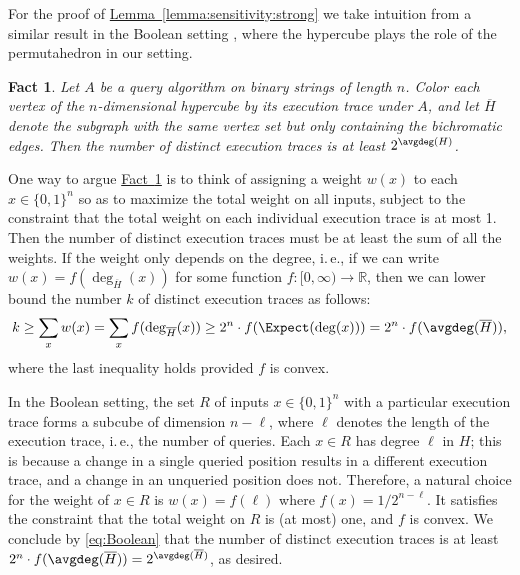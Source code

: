 \documentclass[11pt]{article}
\numberwithin{equation}{section}
\newtheorem{fact}[theorem]{Fact}
\theoremstyle{definition}
\theoremstyle{plain}
\newcommand{\ie}{i.\,e.}
\newcommand{\expref}[2]{\hyperref[#2]{#1~\ref{#2}}}
\begin{document}
For the proof of \expref{Lemma}{lemma:sensitivity:strong} we take intuition from a similar result in the Boolean setting \cite[Exercise~8.43]{ODonnell2014}, where the hypercube plays the role of the permutahedron in our setting.
\begin{fact}\label{fact:Boolean} 
Let $A$ be a query algorithm on binary strings of length $n$. Color each vertex of the $n$-dimensional hypercube by its execution trace under $A$, and let $\overline{H}$ denote the subgraph with the same vertex set but only containing the bichromatic edges. Then the number of distinct execution traces is at least $2^{\avgdeg(H)}$.
\end{fact}

One way to argue \expref{Fact}{fact:Boolean} is to think of assigning a weight $w(x)$ to each $x \in \{0,1\}^n$ so as to maximize the total weight on all inputs, subject to the constraint that the total weight on each individual execution trace is at most 1. Then the number of distinct execution traces must be at least the sum of all the weights. If the weight only depends on the degree, \ie, if we can write $w(x) = f(\deg_{\overline{H}}(x))$ for some function $f: [0,\infty) \to \mathbb{R}$, then we can lower bound the number $k$ of distinct execution traces as follows:
\begin{equation}\label{eq:Boolean}
k \ge \sum_x w(x) = \sum_x f(\deg_{\overline{H}}(x)) \ge 2^n \cdot f(\Expect(\deg(x))) = 2^n \cdot f(\avgdeg(\overline{H})),
\end{equation}
where the last inequality holds provided $f$ is convex. 

In the Boolean setting, the set $R$ of inputs $x \in \{0,1\}^n$ with a particular execution trace forms a subcube of dimension $n-\ell$, where $\ell$ denotes the length of the execution trace, \ie, the number of queries. Each $x \in R$ has degree $\ell$ in $H$; this is because a change in a single queried position results in a different execution trace, and a change in an unqueried position does not. Therefore, a natural choice for the weight of $x \in R$ is $w(x) = f(\ell)$ where $f(x) = 1/2^{n-\ell}$. It satisfies the constraint that the total weight on $R$ is (at most) one, and $f$ is convex. We conclude by \eqref{eq:Boolean} that the number of distinct execution traces is at least $2^n \cdot f(\avgdeg(\overline{H})) = 2^{\avgdeg(\overline{H})}$, as desired.
\end{document}
